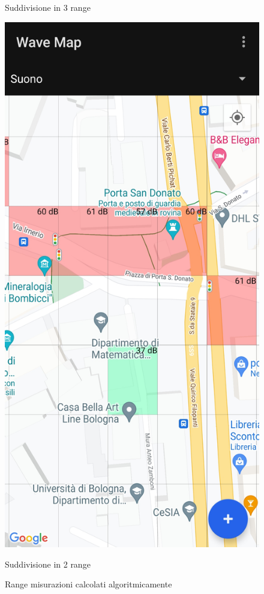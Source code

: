 \documentclass[11pt]{article}
\begin{document}
\begin{figure}[H]
\begin{minipage}[b]{0.25\textwidth}
      \caption*{Suddivisione in 3 range}
    \end{minipage}
    \hspace*{1cm}
    \begin{minipage}[b]{0.25\textwidth}
      \includegraphics[width=\textwidth]{./img/overview/map_ranges.jpg}
      \caption*{Suddivisione in 2 range}
    \end{minipage}
    \caption{Range misurazioni calcolati algoritmicamente} \label{fig:overview_ranges}
\end{figure}
\end{document}
